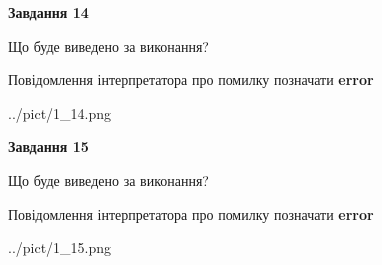 \documentclass[11pt, ukrainian]{article}
\begin{document}
{\begin {large}
{\begin {center}\textbf{Завдання 14}\end {center}}\par
Що буде виведено за виконання? \par
Повідомлення інтерпретатора про помилку позначати \textbf{error}

\begin{center}
	{../pict/1_14.png}
\end{center}
\newpage

{\begin {center}\textbf{Завдання 15}\end {center}}\par
Що буде виведено за виконання? \par
Повідомлення інтерпретатора про помилку позначати \textbf{error}

\begin{center}
	{../pict/1_15.png}
\end{center}
\newpage

\end {large}}
\end{document}
